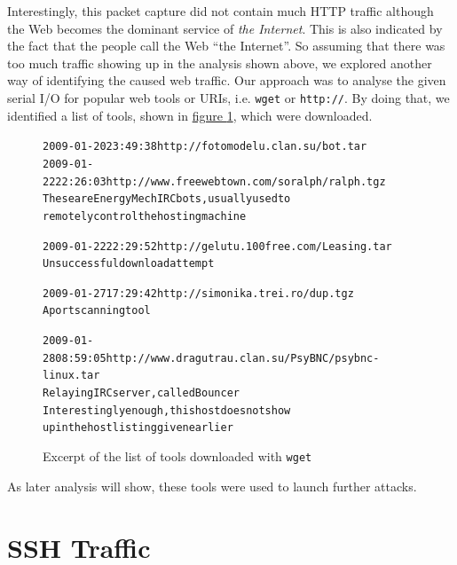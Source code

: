 \documentclass[a4paper,
    11pt,
    normalheadings,
    parindent,
    UKenglish,
    abstracton,
    ]{scrartcl}
\begin{document}
Interestingly, this packet capture did not contain much HTTP traffic although the Web becomes the dominant service of \emph{the Internet}.
This is also indicated by the fact that the people call the Web ``the Internet''.
So assuming that there was too much traffic showing up in the analysis shown above, we explored another way of identifying the caused web traffic.
Our approach was to analyse the given serial I/O for popular web tools or URIs, i.e. \texttt{wget} or \texttt{http://}.
By doing that, we identified a list of tools, shown in
\hyperref[fig:http-downloads]{figure \ref*{fig:http-downloads}},
which were downloaded.
\begin{figure}
\begin{alltt}
2009-01-20 23:49:38  http://fotomodelu.clan.su/bot.tar
2009-01-22 22:26:03  http://www.freewebtown.com/soralph/ralph.tgz
                 These are EnergyMech IRC bots, usually used to
                 remotely control the hosting machine

2009-01-22 22:29:52  http://gelutu.100free.com/Leasing.tar
                 Unsuccessful download attempt

2009-01-27 17:29:42  http://simonika.trei.ro/dup.tgz
                 A port scanning tool

2009-01-28 08:59:05  http://www.dragutrau.clan.su/PsyBNC/psybnc-linux.tar
                Relaying IRC server, called Bouncer
                Interestingly enough, this host does not show
                up in the host listing given earlier
\end{alltt}
\caption{Excerpt of the list of tools downloaded with \texttt{wget}}
\label{fig:http-downloads}
\end{figure}
As later analysis will show, these tools were used to launch further attacks.


\section{SSH Traffic} \label{sec:ssh-traffic}
\end{document}

